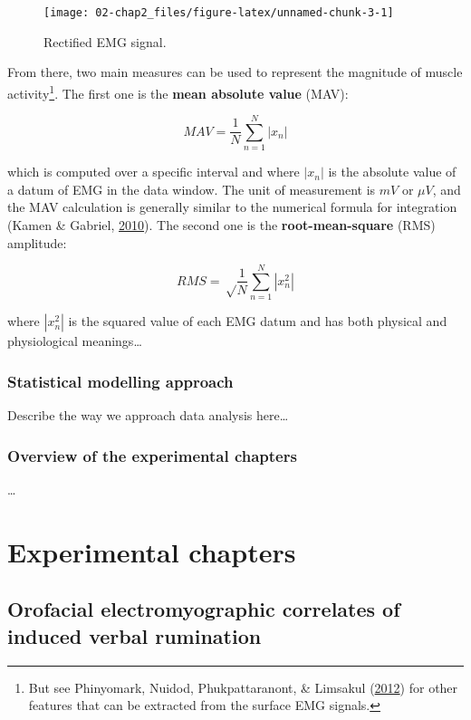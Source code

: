 \documentclass[a4paper,12pt,twoside,openright,oldfontcommands]{memoir}
\let\rmarkdownfootnote\footnote%
\def\footnote{\protect\rmarkdownfootnote}
\begin{document}
\begin{figure}[H]

{\centering \texttt{[image: 02-chap2\_files/figure-latex/unnamed-chunk-3-1]} 

}

\caption{Rectified EMG signal.}\label{fig:unnamed-chunk-3}
\end{figure}

From there, two main measures can be used to represent the magnitude of
muscle activity\footnote{But see Phinyomark, Nuidod, Phukpattaranont, \&
  Limsakul (\protect\hyperlink{ref-phinyomark_feature_2012}{2012}) for
  other features that can be extracted from the surface EMG signals.}.
The first one is the \textbf{mean absolute value} (MAV):

\[MAV = \frac{1}{N} \sum_{n=1}^{N} | x_{n} |\]

which is computed over a specific interval and where \(|x_{n}|\) is the
absolute value of a datum of EMG in the data window. The unit of
measurement is \(mV\) or \(\mu V\), and the MAV calculation is generally
similar to the numerical formula for integration (Kamen \& Gabriel,
\protect\hyperlink{ref-kamen_essentials_2010}{2010}). The second one is
the \textbf{root-mean-square} (RMS) amplitude:

\[RMS = \sqrt \frac{1}{N} \sum_{n=1}^{N} | x^{2}_{n} |\]

where \(| x^{2}_{n} |\) is the squared value of each EMG datum and has
both physical and physiological meanings\ldots{}

\section{Statistical modelling
approach}\label{statistical-modelling-approach}

Describe the way we approach data analysis here\ldots{}

\section{Overview of the experimental
chapters}\label{overview-of-the-experimental-chapters}

\ldots{}

\part{Experimental
chapters}\label{part-experimental-chapters}

\chapter{Orofacial electromyographic correlates of induced verbal
rumination}\label{orofacial-electromyographic-correlates-of-induced-verbal-rumination}
\end{document}
